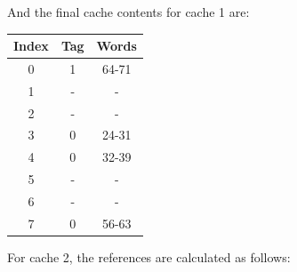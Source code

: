 \documentclass[12pt]{article}
\begin{document}
And the final cache contents for cache 1 are:

\begin{table}[h!]
    \centering
    \begin{tabular}{|c|c|c|}
    \hline
    \textbf{Index} & \textbf{Tag} & \textbf{Words} \\
    \hline
    0              & 1            & 64-71          \\
    \hline
    1              & -            & -              \\
    \hline
    2              & -            & -              \\
    \hline
    3              & 0            & 24-31          \\
    \hline
    4              & 0            & 32-39          \\
    \hline
    5              & -            & -              \\
    \hline
    6              & -            & -              \\
    \hline
    7              & 0            & 56-63          \\
    \hline
    \end{tabular}
\end{table}

For cache 2, the references are calculated as follows:
\end{document}
